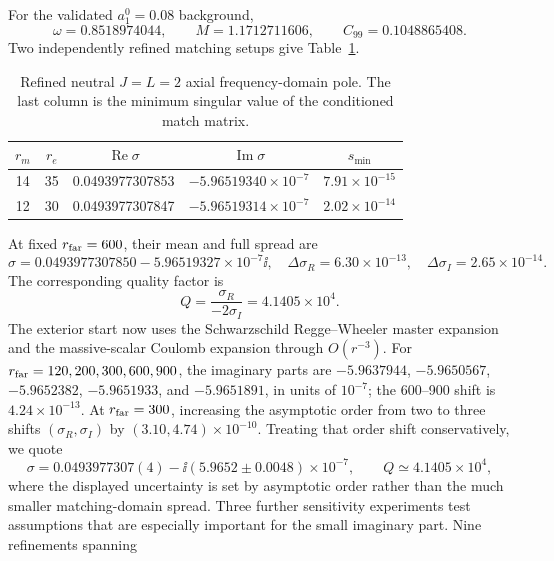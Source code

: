 For the validated $a_1^0=0.08$ background,
\begin{equation}
\omega=0.8518974044,\qquad M=1.1712711606,\qquad C_{99}=0.1048865408.
\end{equation}
Two independently refined matching setups give Table~\ref{tab:first-axial-qnm}.
\begin{table}[t]
\centering
\caption{Refined neutral $J=L=2$ axial frequency-domain pole.  The last
column is the minimum singular value of the conditioned match matrix.}
\label{tab:first-axial-qnm}
\small
\begin{tabular}{@{}ccccc@{}}
\toprule
$r_m$ & $r_e$ & $\operatorname{Re}\sigma$ & $\operatorname{Im}\sigma$
& $s_{\min}$\\
\midrule
14 & 35 & 0.0493977307853 & $-5.96519340\times10^{-7}$ & $7.91\times10^{-15}$\\
12 & 30 & 0.0493977307847 & $-5.96519314\times10^{-7}$ & $2.02\times10^{-14}$\\
\bottomrule
\end{tabular}
\end{table}
At fixed $r_{\rm far}=600$, their mean and full spread are
\begin{equation}
\sigma=0.0493977307850-5.96519327\times10^{-7}\ii,
\quad
\Delta\sigma_R=6.30\times10^{-13},
\quad
\Delta\sigma_I=2.65\times10^{-14}.
\label{eq:first-axial-qnm}
\end{equation}
The corresponding quality factor is
\begin{equation}
Q=\frac{\sigma_R}{-2\sigma_I}=4.1405\times10^4.
\end{equation}
The exterior start now uses the Schwarzschild Regge--Wheeler master expansion
and the massive-scalar Coulomb expansion through $O(r^{-3})$. For
$r_{\rm far}=120,200,300,600,900$, the imaginary parts are
$-5.9637944$, $-5.9650567$, $-5.9652382$, $-5.9651933$, and $-5.9651891$,
in units of $10^{-7}$; the 600--900 shift is $4.24\times10^{-13}$. At
$r_{\rm far}=300$, increasing the asymptotic order from two to three shifts
$(\sigma_R,\sigma_I)$ by $(3.10,4.74)\times10^{-10}$. Treating that order
shift conservatively, we quote
\begin{equation}
\sigma=0.0493977307(4)-\ii(5.9652\pm0.0048)\times10^{-7},
\qquad Q\simeq4.1405\times10^4,
\end{equation}
where the displayed uncertainty is set by asymptotic order rather than the
much smaller matching-domain spread.
Three further sensitivity experiments test assumptions that are especially
important for the small imaginary part. Nine refinements spanning
